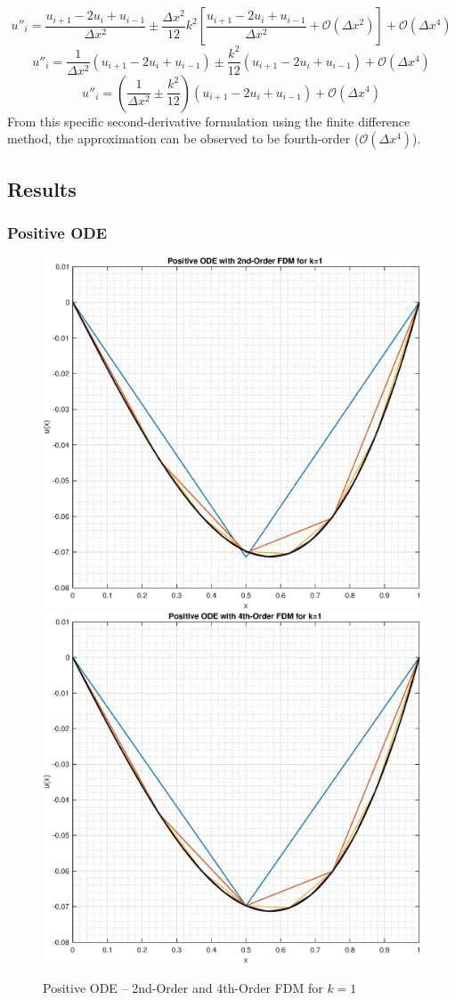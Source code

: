 \documentclass[10pt, reqno]{article}		%
\numberwithin{equation}{section}
\begin{document}
\begin{equation}
u''_i = \frac{u_{i+1} -2u_i + u_{i-1}}{\Delta x^2} \pm \frac{\Delta x^2}{12} k^2 \left[\frac{u_{i+1} -2u_i + u_{i-1}}{\Delta x^2} + \mathcal{O}(\Delta x^2) \right] + \mathcal{O}(\Delta x^4)
\end{equation}
\begin{equation}
u''_i = \frac{1}{\Delta x^2} (u_{i+1} -2u_i + u_{i-1}) \pm \frac{k^2}{12} (u_{i+1} -2u_i + u_{i-1}) + \mathcal{O}(\Delta x^4)
\end{equation}
\begin{equation}
u''_i = \left(\frac{1}{\Delta x^2} \pm \frac{k^2}{12}\right) (u_{i+1} -2u_i + u_{i-1}) + \mathcal{O}(\Delta x^4)
\end{equation}
From this specific second-derivative formulation using the finite difference method, the approximation can be observed to be fourth-order ($\mathcal{O}(\Delta x^4)$).

\newpage

\subsection{Results}

\subsubsection{Positive ODE}

\begin{figure}[H]
	\begin{center}
		\includegraphics[width = 0.49\linewidth]{positive_ode_order_2_k_1}
		\includegraphics[width = 0.49\linewidth]{positive_ode_order_4_k_1}
		\caption{Positive ODE -- 2nd-Order and 4th-Order FDM for $k = 1$}
	\end{center}
\end{figure}
\end{document}
